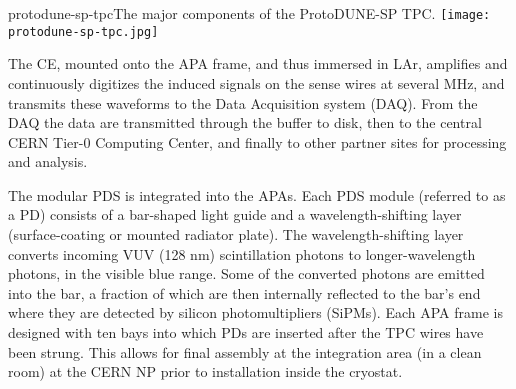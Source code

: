 \begin{cdrfigure}{protodune-sp-tpc}{The major components of the ProtoDUNE-SP TPC. }
\texttt{[image: protodune-sp-tpc.jpg]}
\end{cdrfigure}

The CE, mounted onto the APA frame, and thus immersed in LAr, amplifies and continuously digitizes the induced signals on the sense wires at several MHz, and transmits these waveforms to the Data Acquisition system (DAQ). From the DAQ the data are  transmitted through the buffer to disk, then to the central CERN Tier-0 Computing Center, and finally to other partner sites for processing and analysis.  

The modular PDS is integrated into the APAs. Each PDS module (referred to as a PD) consists of a bar-shaped light guide and
a wavelength-shifting layer (surface-coating or mounted radiator plate). The wavelength-shifting layer converts incoming VUV (128 nm) 
scintillation photons to longer-wavelength photons, in the visible blue range. Some of the converted photons are emitted into the bar, a fraction of which are then internally reflected to the bar's end where they are detected by silicon photomultipliers (SiPMs).
Each APA frame is designed with ten bays into which PDs are inserted after the TPC wires have been strung. This  allows for final assembly at the integration area (in a clean room) at the CERN NP prior to installation inside the cryostat. 


